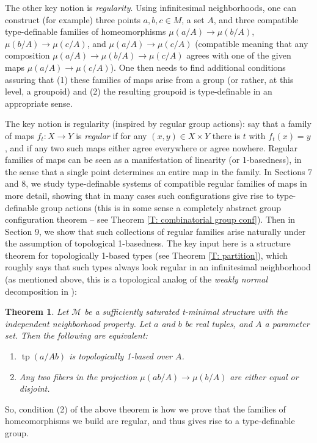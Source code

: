 \documentclass{amsart}
\newtheorem{introtheorem}{Theorem}
\theoremstyle{definition}
\newcommand{\tp}{\operatorname{tp}}
\begin{document}
The other key notion is \textit{regularity}. Using infinitesimal neighborhoods, one can construct (for example) three points $a,b,c\in M$, a set $A$, and three compatible type-definable families of homeomorphisms $\mu(a/A)\rightarrow\mu(b/A)$, $\mu(b/A)\rightarrow\mu(c/A)$, and $\mu(a/A)\rightarrow\mu(c/A)$ (compatible meaning that any composition $\mu(a/A)\rightarrow\mu(b/A)\rightarrow\mu(c/A)$ agrees with one of the given maps $\mu(a/A)\rightarrow\mu(c/A)$). One then needs to find additional conditions assuring that (1) these families of maps arise from a group (or rather, at this level, a groupoid) and (2) the resulting groupoid is type-definable in an appropriate sense.

The key notion is regularity (inspired by regular group actions): say that a family of maps $f_t:X\rightarrow Y$ is \textit{regular} if for any $(x,y)\in X\times Y$ there is $t$ with $f_t(x)=y$, and if any two such maps either agree everywhere or agree nowhere. Regular families of maps can be seen as a manifestation of linearity (or 1-basedness), in the sense that a single point determines an entire map in the family. In Sections 7 and 8, we study type-definable systems of compatible regular families of maps in more detail, showing that in many cases such configurations give rise to type-definable group actions (this is in some sense a completely abstract group configuration theorem -- see Theorem \ref{T: combinatorial group conf}). Then in Section 9, we show that such collections of regular families arise naturally under the assumption of topological 1-basedness. The key input here is a structure theorem for topologically 1-based types (see Theorem \ref{T: partition}), which roughly says that such types always look regular in an infinitesimal neighborhood (as mentioned above, this is a topological analog of the \textit{weakly normal} decomposition in \cite{HrPi87}):

\begin{introtheorem}\label{IT: partition} Let $\mathcal M$ be a sufficiently saturated t-minimal structure with the independent neighborhood property. Let $a$ and $b$ be real tuples, and $A$ a parameter set. Then the following are equivalent: 
\begin{enumerate}
    \item $\tp(a/Ab)$ is topologically 1-based over $A$.
    \item Any two fibers in the projection $\mu(ab/A)\rightarrow\mu(b/A)$ are either equal or disjoint. 
\end{enumerate}
\end{introtheorem}
So, condition (2) of the above theorem is how we prove that the families of homeomorphisms we build are regular, and thus gives rise to a type-definable group. 
\end{document}
